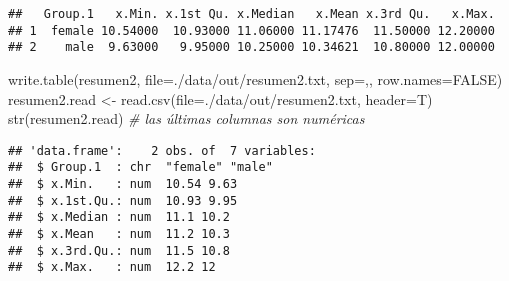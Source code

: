 \documentclass[
]{article}
\newenvironment{Shaded}{\begin{snugshade}}{\end{snugshade}}
\newcommand{\AttributeTok}[1]{\textcolor[rgb]{0.77,0.63,0.00}{#1}}
\newcommand{\CommentTok}[1]{\textcolor[rgb]{0.56,0.35,0.01}{\textit{#1}}}
\newcommand{\ConstantTok}[1]{\textcolor[rgb]{0.00,0.00,0.00}{#1}}
\newcommand{\FunctionTok}[1]{\textcolor[rgb]{0.00,0.00,0.00}{#1}}
\newcommand{\NormalTok}[1]{#1}
\newcommand{\OtherTok}[1]{\textcolor[rgb]{0.56,0.35,0.01}{#1}}
\newcommand{\SpecialCharTok}[1]{\textcolor[rgb]{0.00,0.00,0.00}{#1}}
\newcommand{\StringTok}[1]{\textcolor[rgb]{0.31,0.60,0.02}{#1}}
\begin{document}
\begin{Shaded}
\end{Shaded}

\begin{verbatim}
##   Group.1   x.Min. x.1st Qu. x.Median   x.Mean x.3rd Qu.   x.Max.
## 1  female 10.54000  10.93000 11.06000 11.17476  11.50000 12.20000
## 2    male  9.63000   9.95000 10.25000 10.34621  10.80000 12.00000
\end{verbatim}

\begin{Shaded}
\begin{Highlighting}[]
\FunctionTok{write.table}\NormalTok{(resumen2, }\AttributeTok{file=}\StringTok{\textquotesingle{}./data/out/resumen2.txt\textquotesingle{}}\NormalTok{, }\AttributeTok{sep=}\StringTok{\textquotesingle{},\textquotesingle{}}\NormalTok{, }\AttributeTok{row.names=}\ConstantTok{FALSE}\NormalTok{)}
\NormalTok{resumen2.read }\OtherTok{\textless{}{-}} \FunctionTok{read.csv}\NormalTok{(}\AttributeTok{file=}\StringTok{\textquotesingle{}./data/out/resumen2.txt\textquotesingle{}}\NormalTok{, }\AttributeTok{header=}\NormalTok{T)}
\FunctionTok{str}\NormalTok{(resumen2.read)  }\CommentTok{\# las últimas columnas son numéricas}
\end{Highlighting}
\end{Shaded}

\begin{verbatim}
## 'data.frame':    2 obs. of  7 variables:
##  $ Group.1  : chr  "female" "male"
##  $ x.Min.   : num  10.54 9.63
##  $ x.1st.Qu.: num  10.93 9.95
##  $ x.Median : num  11.1 10.2
##  $ x.Mean   : num  11.2 10.3
##  $ x.3rd.Qu.: num  11.5 10.8
##  $ x.Max.   : num  12.2 12
\end{verbatim}
\end{document}
